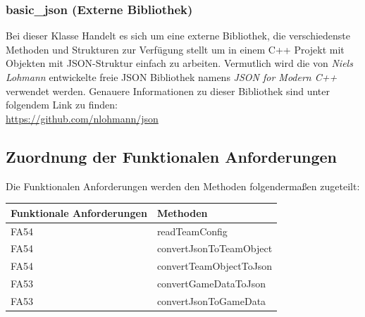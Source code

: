     \subsubsection{basic\_json (Externe Bibliothek)}
		Bei dieser Klasse Handelt es sich um eine externe Bibliothek, die verschiedenste Methoden und Strukturen zur Verfügung stellt um in einem C++ Projekt mit Objekten mit JSON-Struktur einfach zu arbeiten. Vermutlich wird die von \textit{Niels Lohmann} entwickelte freie JSON Bibliothek namens \textit{JSON for Modern C++} verwendet werden. Genauere Informationen zu dieser Bibliothek sind unter folgendem Link zu finden: \\ \url{https://github.com/nlohmann/json}

\newpage

\subsection{Zuordnung der Funktionalen Anforderungen}

Die Funktionalen Anforderungen werden den Methoden folgendermaßen zugeteilt:


\begin{table}[h]
	\centering
	\begin{tabular}{|l|l|}
    	\hline
    	\textbf{Funktionale Anforderungen} & \textbf{Methoden} \\ \hline
    	FA54 & readTeamConfig \\ \hline
    	FA54 & convertJsonToTeamObject \\ \hline
    	FA54 & convertTeamObjectToJson \\ \hline
    	FA53 & convertGameDataToJson \\ \hline
    	FA53 & convertJsonToGameData \\ \hline

	\end{tabular}
\end{table}